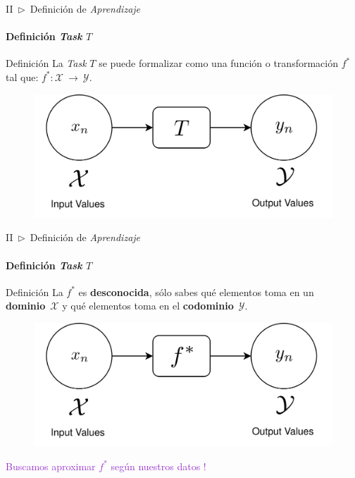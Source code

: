 \documentclass[xcolor=dvipsnames]{beamer}
\begin{document}
    \begin{frame}{II~$\rhd$~Definición de \textit{Aprendizaje}}
    \framesubtitle{Definición \textit{Task} \( T \)}
        \begin{block}{Definición}
        La \textit{Task} \( T \) se puede formalizar como una función o transformación $f^{*}$ tal que: $f^{*}:\mathcal{X}~\rightarrow~\mathcal{Y}$.
        \end{block}
        \vspace{5mm}
        \begin{figure}
            \centering
            \includegraphics[width=0.8\linewidth]{imgs/def01/task01.png}
        \end{figure}
    \end{frame}

    \begin{frame}{II~$\rhd$~Definición de \textit{Aprendizaje}}
    \framesubtitle{Definición \textit{Task} \( T \)}
        \begin{block}{Definición}
        La $f^{*}$ es \textbf{desconocida}, sólo sabes qué elementos toma en un \textbf{dominio}~$\mathcal{X}$ y qué elementos toma en el \textbf{codominio}~$\mathcal{Y}$.
        \end{block}
        \vspace{5mm}
        \begin{figure}
            \centering
            \includegraphics[width=0.8\linewidth]{imgs/def01/task02.png}
        \end{figure}
        \textcolor{DarkOrchid}{Buscamos aproximar $f^{*}$ según nuestros datos !}
    \end{frame}
\end{document}
